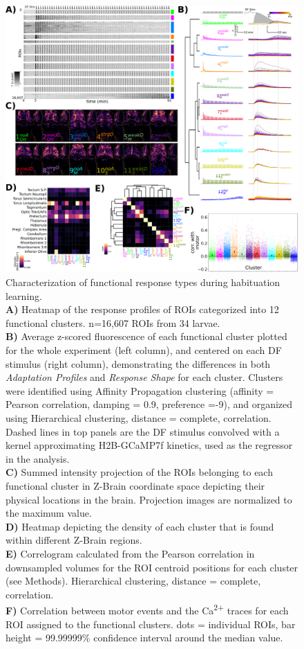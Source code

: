 \documentclass[9pt,lineno]{RandlettLab_elife}
\begin{document}
\begin{figure}
\begin{fullwidth}
\begin{center}
\includegraphics[width=0.95\linewidth]{Figure2 - Clustering.png}
\caption{
Characterization of functional response types during habituation learning. 
\\ \textbf{A)} Heatmap of the response profiles of ROIs categorized into 12 functional clusters. n=16,607 ROIs from 34 larvae. 
\\ \textbf{B)} Average z-scored fluorescence of each functional cluster plotted for the whole experiment (left column), and centered on each DF stimulus (right column), demonstrating the differences in both \emph{Adaptation Profiles} and \emph{Response Shape} for each cluster. Clusters were identified using Affinity Propagation clustering (affinity = Pearson correlation, damping = 0.9, preference =-9), and organized using Hierarchical clustering, distance = complete, correlation. Dashed lines in top panels are the DF stimulus convolved with a kernel approximating H2B-GCaMP7f kinetics, used as the regressor in the analysis. 
\\ \textbf{C)} Summed intensity projection of the ROIs belonging to each functional cluster in Z-Brain coordinate space depicting their physical locations in the brain. Projection images are normalized to the maximum value. 
\\ \textbf{D)} Heatmap depicting the density of each cluster that is found within different Z-Brain regions. 
\\ \textbf{E)} Correlogram calculated from the Pearson correlation in downsampled volumes for the ROI centroid positions for each cluster (see Methods). Hierarchical clustering, distance = complete, correlation. 
\\ \textbf{F)} Correlation between motor events and the Ca\textsuperscript{2+} traces for each ROI assigned to the functional clusters. dots = individual ROIs, bar height = 99.99999\% confidence interval around the median value. 
}
\label{fig:2}
\end{center}
\end{fullwidth}
\end{figure}
\end{document}
